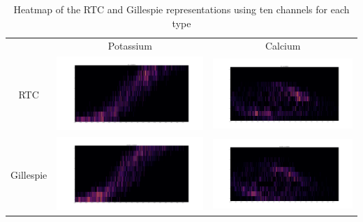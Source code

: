 \begin{table}[]
    \centering
    \begin{tabular}{ccc}
        & Potassium & Calcium\\
        RTC &
        \includegraphics[width=.45\linewidth,valign=m]{Figures/10/K_RTC_.png} &
        \includegraphics[width=.45\linewidth,valign=m]{Figures/10/Ca_RTC_.png} \\
        Gillespie &
        \includegraphics[width=.45\linewidth,valign=m]{Figures/10/K_GILLESPIE_.png} &
        \includegraphics[width=.45\linewidth,valign=m]{Figures/10/Ca_GILLESPIE_.png} \\
    \end{tabular}
    \caption{Heatmap of the RTC and Gillespie representations using ten channels for each type}
    \label{tab:my_label}
\end{table}


